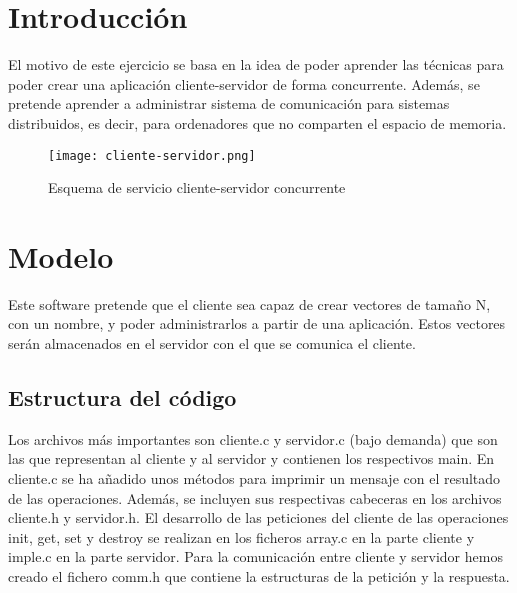 \documentclass[10pt, spanish, pdftex]{template/UC3M_document}
\author{Alejandro Prieto Macías}         %
\begin{document}
\titleMain

\begin{spacing}{0.5}
    \hypersetup{linkcolor=black}    %
    \tableofcontents\newpage        %
\end{spacing}


\section{Introducción}\label{section_label}
El motivo de este ejercicio se basa en la idea de poder aprender las técnicas para poder crear una aplicación cliente-servidor de forma concurrente. Además, se pretende aprender a administrar sistema de comunicación para sistemas distribuidos, es decir, para ordenadores que no comparten el espacio de memoria.

  \vspace{2cm}
  \begin{figure}[h]
    \centering
    \texttt{[image: cliente-servidor.png]}
    \caption{Esquema de servicio cliente-servidor concurrente}
  \end{figure}


\newpage
\section{Modelo}
Este software pretende que el cliente sea capaz de crear vectores de tamaño N, con un nombre, y poder administrarlos a partir de una aplicación. Estos vectores serán almacenados en el servidor con el que se comunica el cliente.

\subsection{Estructura del código}
Los archivos más importantes son cliente.c y servidor.c (bajo demanda) que son las que representan al cliente y al servidor y contienen los respectivos main. En cliente.c se ha añadido unos métodos para imprimir un mensaje con el resultado de las operaciones. Además, se incluyen sus respectivas cabeceras en los archivos cliente.h y servidor.h. El desarrollo de las peticiones del cliente de las operaciones init, get, set y destroy se realizan en los ficheros array.c en la parte cliente y imple.c en la parte servidor.
Para la comunicación entre cliente y servidor hemos creado el fichero comm.h que contiene la estructuras de la petición y la respuesta.
\end{document}
